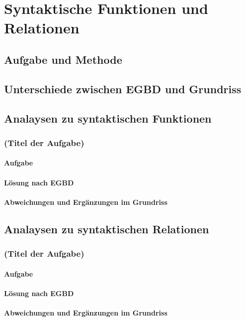 \chapter{Syntaktische Funktionen und Relationen}
\label{sec:syntaktischefunktionenundrelationen}

\section{Aufgabe und Methode}
\label{sec:syntaktischefunktionenundrelationen:aufgabeundmethoden}

\section{Unterschiede zwischen EGBD und Grundriss}
\label{sec:syntaktischefunktionenundrelationen:unterschiedezwischenegbdundgrundriss}

\section{Analaysen zu syntaktischen Funktionen}
\label{sec:syntaktischefunktionenundrelationen:analysenzusyntaktiaschenfunktionen}

\subsection{(Titel der Aufgabe)}

\subsubsection{Aufgabe}

\subsubsection{Lösung nach EGBD}

\subsubsection{Abweichungen und Ergänzungen im Grundriss}


\section{Analaysen zu syntaktischen Relationen}
\label{sec:syntaktischefunktionenundrelationen:analysenzusyntaktiaschenrelationen}

\subsection{(Titel der Aufgabe)}

\subsubsection{Aufgabe}

\subsubsection{Lösung nach EGBD}

\subsubsection{Abweichungen und Ergänzungen im Grundriss}
